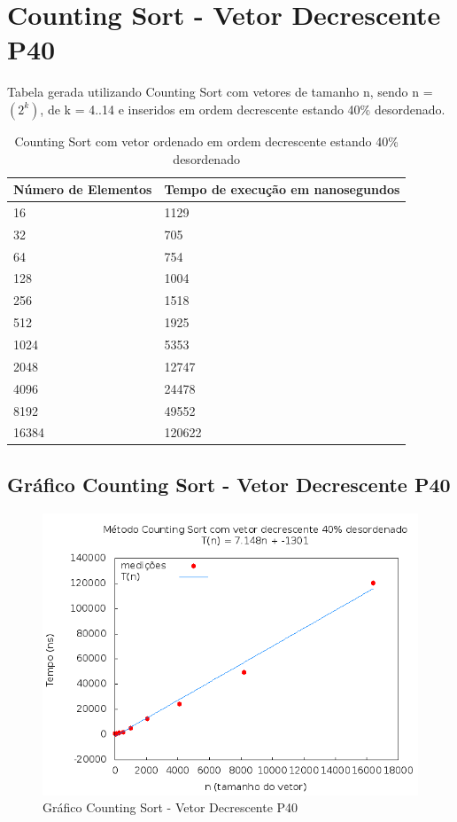 \documentclass[12pt,a4paper,twoside]{report}
\begin{document}
\section{Counting Sort - Vetor Decrescente P40}
Tabela gerada utilizando Counting Sort com vetores de tamanho n, sendo n = $(2^k)$, de k = 4..14 e inseridos em ordem decrescente estando 40\% desordenado.
\begin{table}[H]
\centering
\caption{Counting Sort com vetor ordenado em ordem decrescente estando 40\% desordenado}
\label{my-label}
\begin{tabular}{|l|l|}
\hline
\multicolumn{1}{|c|}{\textbf{Número de Elementos}} & \multicolumn{1}{c|}{\textbf{Tempo de execução em nanosegundos}} \\ \hline
16 & 1129 \\ \hline
32 & 705 \\ \hline
64 & 754 \\ \hline
128 & 1004 \\ \hline
256 & 1518 \\ \hline
512 & 1925 \\ \hline
1024 & 5353 \\ \hline
2048 & 12747 \\ \hline
4096 & 24478 \\ \hline
8192 & 49552 \\ \hline
16384 & 120622 \\ \hline
\end{tabular}
\end{table}

\subsection{Gráfico Counting Sort - Vetor Decrescente P40}
\begin{figure}[H]
    \centering
    \includegraphics[width=0.7\linewidth]{graficos/CountingSort/vIntDecrescenteP40/vIntDecrescenteP40.png}
  \caption{Gráfico Counting Sort - Vetor Decrescente P40}
\end{figure}
\end{document}
